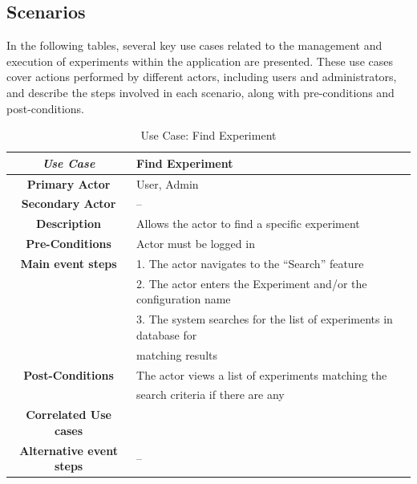 \subsection{Scenarios}
In the following tables, several key use cases related to the management and execution of experiments within the application are presented. These use cases cover actions performed by different actors, including users and administrators, and describe the steps involved in each scenario, along with pre-conditions and post-conditions.
\begin{table}[ht!]
    \centering
    \caption{Use Case: Find Experiment}
    \begin{tabularx}{\textwidth}{|Sl|S{X}|}
        \hline
        \textbf{\textit{Use Case}}       & \textbf{Find Experiment}                                           \\ \hline
        \textbf{Primary Actor}           & User, Admin                                                        \\ \hline
        \textbf{Secondary Actor}         & --                                                                 \\ \hline
        \textbf{Description}             & Allows the actor to find a specific experiment                     \\ \hline
        \textbf{Pre-Conditions}          & Actor must be logged in                                            \\ \hline
        \textbf{Main event steps}        & 1. The actor navigates to the “Search” feature                     \\
                                         & 2. The actor enters the Experiment and/or the configuration name   \\
                                         & 3. The system searches for the list of experiments in database for \\
                                         & matching results                                                   \\ \hline
        \textbf{Post-Conditions}         & The actor views a list of experiments matching the                 \\
                                         & search criteria if there are any                                   \\ \hline
        \textbf{Correlated Use cases}    &                                                                    \\ \hline
        \textbf{Alternative event steps} & --                                                                 \\ \hline
    \end{tabularx}
\end{table}

